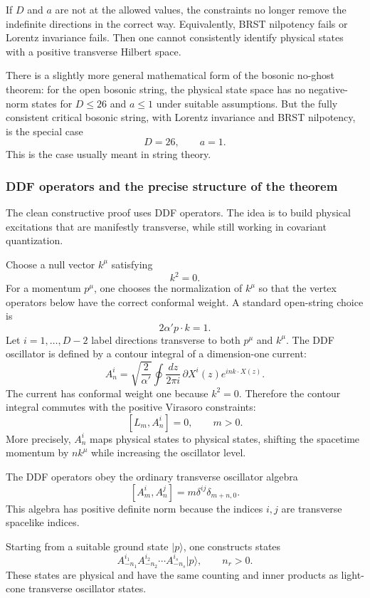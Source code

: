 \documentclass[
  10pt,
  a4paper,
  openany]{book}
\begin{document}
If \(D\) and \(a\) are not at the allowed values, the constraints no
longer remove the indefinite directions in the correct way.
Equivalently, BRST nilpotency fails or Lorentz invariance fails. Then
one cannot consistently identify physical states with a positive
transverse Hilbert space.

There is a slightly more general mathematical form of the bosonic
no-ghost theorem: for the open bosonic string, the physical state space
has no negative-norm states for \(D\leq 26\) and \(a\leq 1\) under
suitable assumptions. But the fully consistent critical bosonic string,
with Lorentz invariance and BRST nilpotency, is the special case \[
D=26,
\qquad
a=1.
\] This is the case usually meant in string theory.

\subsubsection{DDF operators and the precise structure of the
theorem}\label{ddf-operators-and-the-precise-structure-of-the-theorem}

The clean constructive proof uses DDF operators. The idea is to build
physical excitations that are manifestly transverse, while still working
in covariant quantization.

Choose a null vector \(k^\mu\) satisfying \[
k^2=0.
\] For a momentum \(p^\mu\), one chooses the normalization of \(k^\mu\)
so that the vertex operators below have the correct conformal weight. A
standard open-string choice is \[
2\alpha' p\cdot k=1.
\] Let \(i=1,\dots,D-2\) label directions transverse to both \(p^\mu\)
and \(k^\mu\). The DDF oscillator is defined by a contour integral of a
dimension-one current: \[
A_n^i
=
\sqrt{\frac{2}{\alpha'}}
\oint\frac{dz}{2\pi i}\,
\partial X^i(z)e^{in k\cdot X(z)}.
\] The current has conformal weight one because \(k^2=0\). Therefore the
contour integral commutes with the positive Virasoro constraints: \[
[L_m,A_n^i]=0,
\qquad
m>0.
\] More precisely, \(A_n^i\) maps physical states to physical states,
shifting the spacetime momentum by \(nk^\mu\) while increasing the
oscillator level.

The DDF operators obey the ordinary transverse oscillator algebra \[
[A_m^i,A_n^j]
=
m\delta^{ij}\delta_{m+n,0}.
\] This algebra has positive definite norm because the indices \(i,j\)
are transverse spacelike indices.

Starting from a suitable ground state \(|p\rangle\), one constructs
states \[
A_{-n_1}^{i_1}A_{-n_2}^{i_2}\cdots A_{-n_s}^{i_s}|p\rangle,
\qquad
n_r>0.
\] These states are physical and have the same counting and inner
products as light-cone transverse oscillator states.
\end{document}
